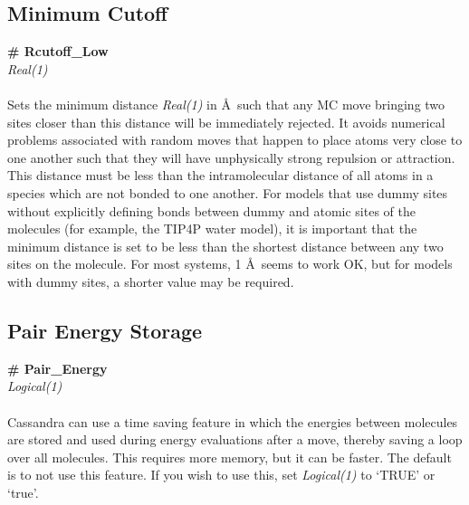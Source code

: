 \subsection{Minimum Cutoff}\label{sec:Rcutoff_Low}
{\bf \# Rcutoff\_Low} \\
{\it Real(1)} \\ \\
%
Sets the minimum  distance {\it Real(1)} in \AA\ such that any MC move bringing two sites closer
than this distance will be immediately rejected. It avoids numerical
problems associated with random moves that happen to place atoms very
close to one another such that they will have unphysically strong repulsion or
attraction. This distance must be less than the intramolecular
distance of all atoms in a species which are not bonded to one
another. For models that use dummy sites without explicitly defining
bonds between dummy and atomic sites of the molecules (for example,
the TIP4P water model), it is important that the minimum distance is set to be less
than the shortest distance between any two sites on the molecule. For
most systems, 1 \AA\ seems to work OK, but for models with dummy
sites, a shorter value may be required. 
%
%
\subsection{Pair Energy Storage}\label{sec:Pair_Energy}
{\bf \# Pair\_Energy} \\
{\it Logical(1)} \\ \\
%
Cassandra can use a time saving feature in which the energies between
molecules are stored and used during energy evaluations after a move,
thereby saving a loop over all molecules. This requires more memory,
but it can be faster. The default is to not use 
this feature. If you wish to use this, set {\it Logical(1)} to `TRUE' or `true'. 
%
%
%
%

